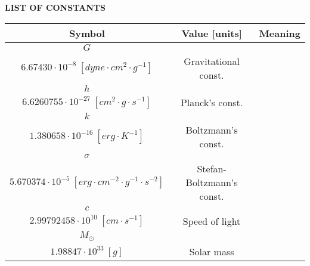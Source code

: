 \newpage

{}
\noindent \Large \textbf{LIST OF CONSTANTS}
\normalsize

\vspace{10mm}
\begin{center}

\begingroup
\def\arraystretch{1.5}

\begin{tabularx}{\textwidth}{ccX}
\hline
\hline
\textbf{Symbol}	& \textbf{Value [units]} & \textbf{Meaning} \\
\hline
\hline
$G$	&
	\begin{tabular}{c}
		 $6.67430 \cdot 10^{-11}\ [N \cdot m^2 \cdot kg^{-2}]$ \\
		 $6.67430 \cdot 10^{-8}\ [dyne \cdot cm^2 \cdot g^{-1}]$
	\end{tabular} 
	& Gravitational const. \\

$h$ &
	\begin{tabular}{c}
		 $...$ \\
		 $6.6260755 \cdot 10^{-27}\ [cm^2 \cdot g \cdot s^{-1}]$
	\end{tabular} 
	& Planck's const. \\
	
$k$ &
	\begin{tabular}{c}
		 $...$ \\
		 $1.380658 \cdot 10^{-16}\ [erg \cdot K^{-1}]$
	\end{tabular} 
	& Boltzmann's const. \\
	
$\sigma$ &
	\begin{tabular}{c}
		 $...$ \\
		 $5.670374 \cdot 10^{-5}\ [erg \cdot cm^{-2} \cdot g^{-1} \cdot s^{-2}]$
	\end{tabular} 
	& Stefan-Boltzmann's const. \\

$c$ &
	\begin{tabular}{c}
		 $2.99792458 \cdot 10^{8}\ [m \cdot s^{-1}]$ \\
		 $2.99792458 \cdot 10^{10}\ [cm \cdot s^{-1}]$
	\end{tabular} 
	& Speed of light \\
	
	
$M_{\odot}$	&
	\begin{tabular}{c}
		 $1.98847\cdot 10^{30}\ [kg]$ \\
		 $1.98847\cdot 10^{33}\ [g]$
	\end{tabular} 
	& Solar mass \\
	
\hline

\end{tabularx}

\endgroup

\end{center}
